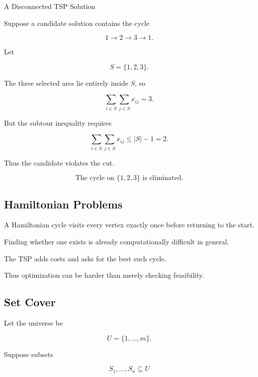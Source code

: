 \begin{workedexamplebox}{A Disconnected TSP Solution}

Suppose a candidate solution contains the cycle

\[
1\to2\to3\to1.
\]

Let

\[
S=\{1,2,3\}.
\]

The three selected arcs lie entirely inside \(S\), so

\[
\sum_{i\in S}
\sum_{j\in S}
x_{ij}
=
3.
\]

But the subtour inequality requires

\[
\sum_{i\in S}
\sum_{j\in S}
x_{ij}
\leq
|S|-1
=
2.
\]

Thus the candidate violates the cut.

\begin{answerbox}
\[
\boxed{
\text{The cycle on }\{1,2,3\}\text{ is eliminated.}
}
\]
\end{answerbox}

\end{workedexamplebox}

\subsection{Hamiltonian Problems}
\label{subsec:hamiltonian-problems}

A Hamiltonian cycle visits every vertex exactly once before returning to
the start.

Finding whether one exists is already computationally difficult in
general.

The TSP adds costs and asks for the best such cycle.

Thus optimization can be harder than merely checking feasibility.

\subsection{Set Cover}
\label{subsec:set-cover}

Let the universe be

\[
U
=
\{1,\ldots,m\}.
\]

Suppose subsets

\[
S_1,\ldots,S_n
\subseteq U
\]

